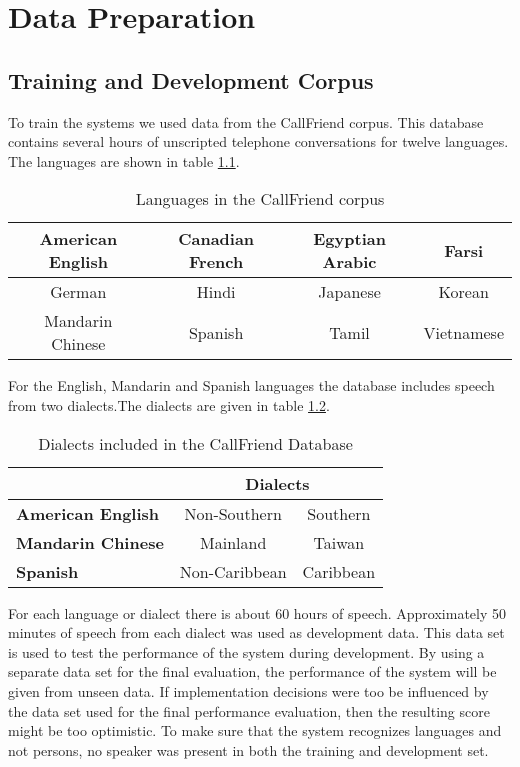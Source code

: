 \chapter{Data Preparation}

\section{Training and Development Corpus}

To train the systems we used data from the CallFriend corpus. This database contains several hours of unscripted telephone conversations for twelve languages. The languages are shown in table \ref{tab:callfriend}.
\begin{table}[hbt]
	\begin{center}
	\caption{Languages in the CallFriend corpus}
	\begin{tabular}{ | c | c | c | c |}
	\hline
	American English & Canadian French & Egyptian Arabic & Farsi \\ \hline
	German & Hindi & Japanese & Korean \\ \hline
	Mandarin Chinese & Spanish & Tamil & Vietnamese \\ \hline
	\hline
	\end{tabular}
	\label{tab:callfriend}
	\end{center}
\end{table}
For the English, Mandarin and Spanish languages the database includes speech from two dialects.The dialects are given in table \ref{tab:callfrienddial}.
\begin{table}[hbt]
	\begin{center}
	\caption{Dialects included in the CallFriend Database}
	\begin{tabular}{| l | c | c |}
		\cline{2-3}
		\multicolumn{1}{l}{}  & \multicolumn{2}{|c|}{\textbf{Dialects}} \\ \hline
		\textbf{American English} & Non-Southern & Southern \\ \hline 
		\textbf{Mandarin Chinese} & Mainland & Taiwan \\ \hline 
		\textbf{Spanish} & Non-Caribbean & Caribbean \\
		\hline
	\end{tabular}
	\label{tab:callfrienddial}
	\end{center}
\end{table}	
For each language or dialect there is about 60 hours of speech. Approximately 50 minutes of speech from each dialect was used as development data. This data set is used to test the performance of the system during development. By using a separate data set for the final evaluation, the performance of the system will be given from unseen data. If implementation decisions were too be influenced by the data set used for the final performance evaluation, then the resulting score might be too optimistic. To make sure that the system recognizes languages and not persons, no speaker was present in both the training and development set. 

